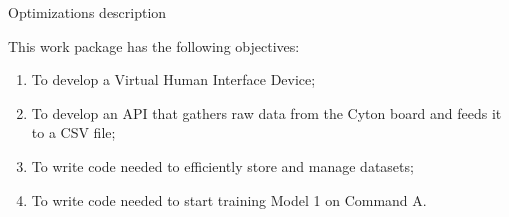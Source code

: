 
\begin{workpackage}{Optimizations}
  \label{wp:opt} %
description



  \makewptable %
    
  \begin{wpobjectives}
    This work package has the following objectives:
    \begin{enumerate}
    \item To develop a Virtual Human Interface Device;
    \item To develop an  API that gathers raw data from the Cyton board and feeds it 
to a CSV file;
    \item To write code needed to efficiently store and manage datasets;
    \item To write code needed to start training Model 1 on Command A.
    \end{enumerate}
  \end{wpobjectives}
  
  \begin{wpdescription}
 

    
  \end{wpdescription}
  

\end{workpackage}
